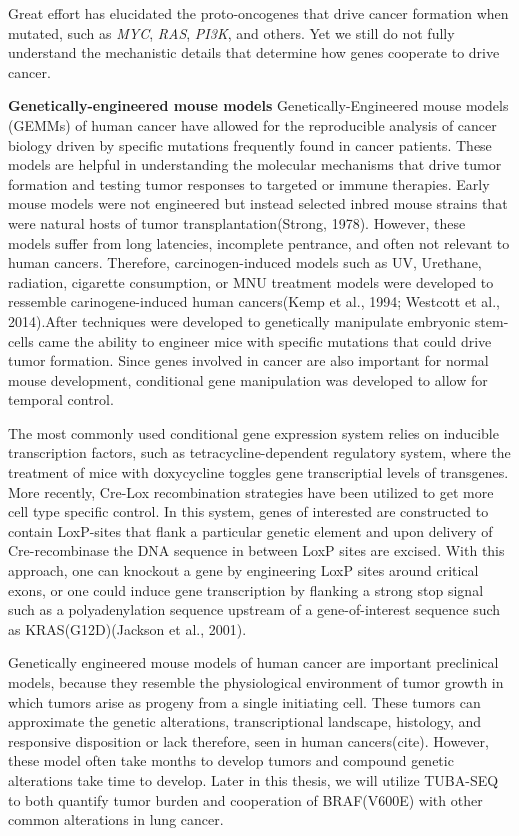 Great effort has elucidated the proto-oncogenes that drive cancer formation when mutated, such as \emph{MYC}, \emph{RAS}, \emph{PI3K}, and others. Yet we still do not fully understand the mechanistic details that determine how genes cooperate to drive cancer.

\textbf{Genetically-engineered mouse models} Genetically-Engineered mouse models (GEMMs) of human cancer have allowed for the reproducible analysis of cancer biology driven by specific mutations frequently found in cancer patients. These models are helpful in understanding the molecular mechanisms that drive tumor formation and testing tumor responses to targeted or immune therapies. Early mouse models were not engineered but instead selected inbred mouse strains that were natural hosts of tumor transplantation(Strong, 1978). However, these models suffer from long latencies, incomplete pentrance, and often not relevant to human cancers. Therefore, carcinogen-induced models such as UV, Urethane, radiation, cigarette consumption, or MNU treatment models were developed to ressemble carinogene-induced human cancers(Kemp et al., 1994; Westcott et al., 2014).After techniques were developed to genetically manipulate embryonic stem-cells came the ability to engineer mice with specific mutations that could drive tumor formation. Since genes involved in cancer are also important for normal mouse development, conditional gene manipulation was developed to allow for temporal control.

The most commonly used conditional gene expression system relies on inducible transcription factors, such as tetracycline-dependent regulatory system, where the treatment of mice with doxycycline toggles gene transcriptial levels of transgenes. More recently, Cre-Lox recombination strategies have been utilized to get more cell type specific control. In this system, genes of interested are constructed to contain LoxP-sites that flank a particular genetic element and upon delivery of Cre-recombinase the DNA sequence in between LoxP sites are excised. With this approach, one can knockout a gene by engineering LoxP sites around critical exons, or one could induce gene transcription by flanking a strong stop signal such as a polyadenylation sequence upstream of a gene-of-interest sequence such as KRAS(G12D)(Jackson et al., 2001).

Genetically engineered mouse models of human cancer are important preclinical models, because they resemble the physiological environment of tumor growth in which tumors arise as progeny from a single initiating cell. These tumors can approximate the genetic alterations, transcriptional landscape, histology, and responsive disposition or lack therefore, seen in human cancers(cite). However, these model often take months to develop tumors and compound genetic alterations take time to develop. Later in this thesis, we will utilize TUBA-SEQ to both quantify tumor burden and cooperation of BRAF(V600E) with other common alterations in lung cancer.

